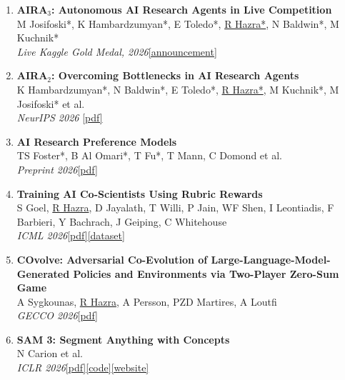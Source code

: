\documentclass[a4paper,10pt]{article}
\newcommand{\cvlink}[2]{\href{#2}{\small\textcolor{accent}{[#1]}}}
\begin{document}
\begin{enumerate}[leftmargin=1.6em, label={\small\arabic*.}, itemsep=2pt]
\small{}

\item \textbf{AIRA$_3$: Autonomous AI Research Agents in Live Competition}\\
    M Josifoski*, K Hambardzumyan*, E Toledo*, \underline{R Hazra*}, N Baldwin*, M Kuchnik*\\
    \textit{Live Kaggle Gold Medal, 2026}\quad\cvlink{announcement}{https://x.com/AIatMeta/status/2096271545589190927}

\item \textbf{AIRA$_2$: Overcoming Bottlenecks in AI Research Agents}\\
    K Hambardzumyan*, N Baldwin*, E Toledo*, \underline{R Hazra*}, M Kuchnik*, M Josifoski* et al.\\
    \textit{NeurIPS 2026} \quad\cvlink{pdf}{https://arxiv.org/pdf/2603.26499}

\item \textbf{AI Research Preference Models}\\
    TS Foster*, B Al Omari*, T Fu*, T Mann, C Domond et al.\\
    \textit{Preprint 2026}\quad\cvlink{pdf}{https://arxiv.org/abs/2608.13940}

\item \textbf{Training AI Co-Scientists Using Rubric Rewards}\\
    S Goel, \underline{R Hazra}, D Jayalath, T Willi, P Jain, WF Shen, I Leontiadis, F Barbieri, Y Bachrach, J Geiping, C Whitehouse\\
    \textit{ICML 2026}\quad\cvlink{pdf}{https://openreview.net/pdf?id=bTySLCPXHO}\quad\cvlink{dataset}{https://huggingface.co/datasets/facebook/research-plan-gen}

  \item \textbf{COvolve: Adversarial Co-Evolution of Large-Language-Model-Generated Policies and Environments via Two-Player Zero-Sum Game}\\
    A Sygkounas, \underline{R Hazra}, A Persson, PZD Martires, A Loutfi\\
    \textit{GECCO 2026}\quad\cvlink{pdf}{https://arxiv.org/pdf/2603.28386}

  \item \textbf{SAM 3: Segment Anything with Concepts}\\
    N Carion et al.\\
    \textit{ICLR 2026}\quad\cvlink{pdf}{https://arxiv.org/pdf/2511.16719v1}\;\cvlink{code}{https://github.com/facebookresearch/sam3}\;\cvlink{website}{https://ai.meta.com/research/sam3/}


\end{enumerate}
\end{document}
